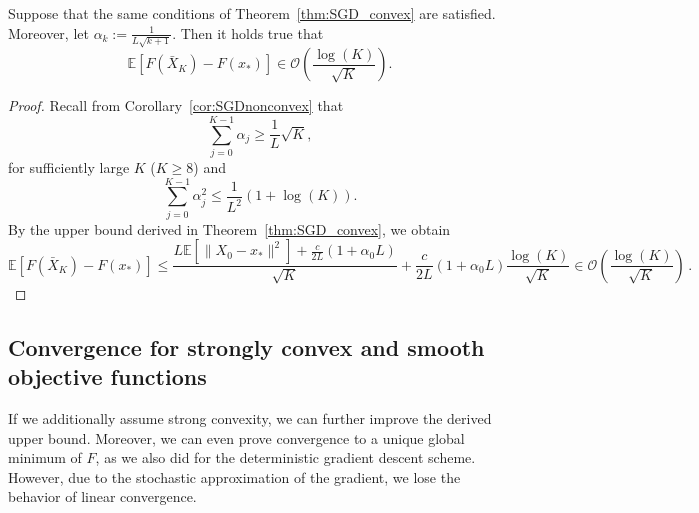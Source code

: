 \documentclass[12pt,openany]{book}
\theoremstyle{definition}
\theoremstyle{definition}
\newcommand{\cO}{\mathcal{O}}
\newcommand{\E}{\mathbb{E}}
\begin{document}
\begin{cor}
Suppose that the same conditions of Theorem~\ref{thm:SGD_convex} are satisfied. Moreover, let $\alpha_k := \frac{1}{L\sqrt{k+1}}$. Then it holds true that
\[ \E[F(\bar X_K)-F(x_\ast)] \in \cO\left(\frac{\log(K)}{\sqrt{K}}\right). \]
\end{cor}
\begin{proof}
Recall from Corollary~\ref{cor:SGDnonconvex} that 
\[\sum_{j=0}^{K-1} \alpha_j \ge \frac1L\sqrt{K}, \]
for sufficiently large $K$ ($K\ge 8$) and 
\[\sum_{j=0}^{K-1}\alpha_j^2 \le \frac{1}{L^2}(1+\log(K)). \]
By the upper bound derived in Theorem~\ref{thm:SGD_convex}, we obtain
\[\E[F(\bar X_K)-F(x_\ast)] \le \frac{L\E[\|X_0-x_\ast\|^2] + \frac{c}{2L} (1+\alpha_0 L)}{\sqrt{K}} + \frac{c}{2L}(1+\alpha_0 L) \frac{\log(K)}{\sqrt{K}}\in \cO\left(\frac{\log(K)}{\sqrt{K}}\right)\, . \]
\end{proof}

\subsection{Convergence for strongly convex and smooth objective functions}\label{sec:SGD_strcnvx}

If we additionally assume strong convexity, we can further improve the derived upper bound. Moreover, we can even prove convergence to a unique global minimum of $F$, as we also did for the deterministic gradient descent scheme. However, due to the stochastic approximation of the gradient, we lose the behavior of linear convergence. 
\end{document}
